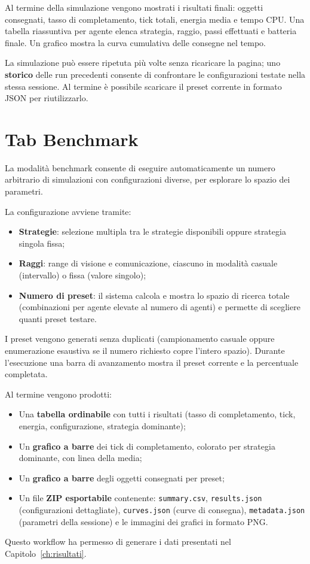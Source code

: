 Al termine della simulazione vengono mostrati i risultati finali: oggetti consegnati,
tasso di completamento, tick totali, energia media e tempo CPU.
Una tabella riassuntiva per agente elenca strategia, raggio, passi effettuati e
batteria finale. Un grafico mostra la curva cumulativa delle consegne nel tempo.

La simulazione pu\`o essere ripetuta pi\`u volte senza ricaricare la pagina;
uno \textbf{storico} delle run precedenti consente di confrontare le configurazioni
testate nella stessa sessione.
Al termine \`e possibile scaricare il preset corrente in formato JSON per riutilizzarlo.

\section{Tab Benchmark}

La modalit\`a benchmark consente di eseguire automaticamente un numero arbitrario di
simulazioni con configurazioni diverse, per esplorare lo spazio dei parametri.

La configurazione avviene tramite:
\begin{itemize}
  \item \textbf{Strategie}: selezione multipla tra le strategie disponibili oppure
        strategia singola fissa;
  \item \textbf{Raggi}: range di visione e comunicazione, ciascuno in modalit\`a
        casuale (intervallo) o fissa (valore singolo);
  \item \textbf{Numero di preset}: il sistema calcola e mostra lo spazio di ricerca
        totale (combinazioni per agente elevate al numero di agenti) e permette di
        scegliere quanti preset testare.
\end{itemize}

I preset vengono generati senza duplicati (campionamento casuale oppure enumerazione
esaustiva se il numero richiesto copre l'intero spazio).
Durante l'esecuzione una barra di avanzamento mostra il preset corrente e la percentuale
completata.

Al termine vengono prodotti:
\begin{itemize}
  \item Una \textbf{tabella ordinabile} con tutti i risultati (tasso di completamento,
        tick, energia, configurazione, strategia dominante);
  \item Un \textbf{grafico a barre} dei tick di completamento, colorato per strategia
        dominante, con linea della media;
  \item Un \textbf{grafico a barre} degli oggetti consegnati per preset;
  \item Un file \textbf{ZIP esportabile} contenente: \texttt{summary.csv},
        \texttt{results.json} (configurazioni dettagliate),
        \texttt{curves.json} (curve di consegna), \texttt{metadata.json}
        (parametri della sessione) e le immagini dei grafici in formato PNG.
\end{itemize}

Questo workflow ha permesso di generare i dati presentati nel Capitolo~\ref{ch:risultati}.
